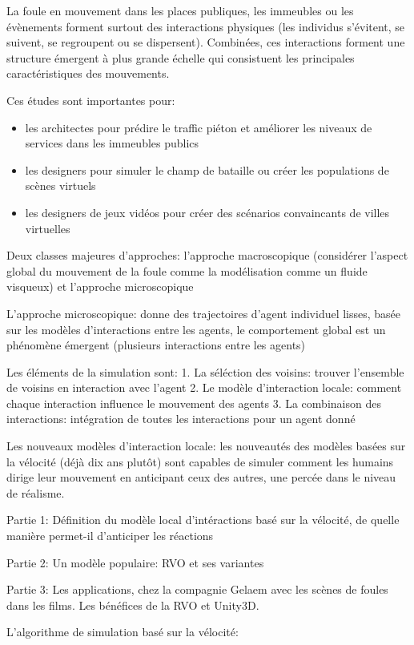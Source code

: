\documentclass[11pt]{report}
\begin{document}
La foule en mouvement dans les places publiques, les immeubles ou les évènements forment surtout des interactions physiques (les individus s'évitent, se suivent, se regroupent ou se dispersent). Combinées, ces interactions forment une structure émergent à plus grande échelle qui consistuent les principales caractéristiques des mouvements.

Ces études sont importantes pour:
\begin{itemize}
\item les architectes pour prédire le traffic piéton et améliorer les niveaux de services dans les immeubles publics
\item les designers pour simuler le champ de bataille ou créer les populations de scènes virtuels
\item les designers de jeux vidéos pour créer des scénarios convaincants de villes virtuelles
\end{itemize}

Deux classes majeures d'approches: l'approche macroscopique (considérer l'aspect global du mouvement de la foule comme la modélisation comme un fluide visqueux) et l'approche microscopique

L'approche microscopique: donne des trajectoires d'agent individuel lisses, basée sur les modèles d'interactions entre les agents, le comportement global est un phénomène émergent (plusieurs interactions entre les agents)

Les éléments de la simulation sont:
1. La séléction des voisins: trouver l'ensemble de voisins en interaction avec l'agent
2. Le modèle d'interaction locale: comment chaque interaction influence le mouvement des agents
3. La combinaison des interactions: intégration de toutes les interactions pour un agent donné

Les nouveaux modèles d'interaction locale: les nouveautés des modèles basées sur la vélocité (déjà dix ans plutôt) sont capables de simuler comment les humains dirige leur mouvement en anticipant ceux des autres, une percée dans le niveau de réalisme.

Partie 1: Définition du modèle local d'intéractions basé sur la vélocité, de quelle manière permet-il d'anticiper les réactions

Partie 2: Un modèle populaire: RVO et ses variantes

Partie 3: Les applications, chez la compagnie Gelaem avec les scènes de foules dans les films. Les bénéfices de la RVO et Unity3D.

L'algorithme de simulation basé sur la vélocité:
\end{document}

